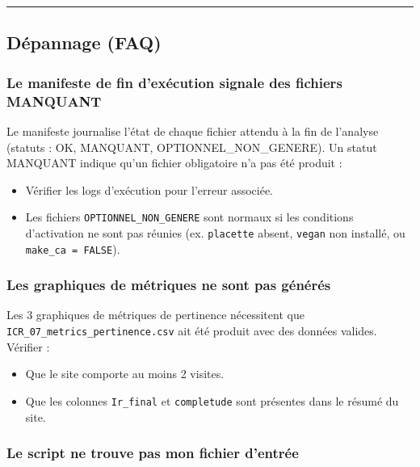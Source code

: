 \begin{center}\rule{0.5\linewidth}{0.5pt}\end{center}

\subsection{Dépannage (FAQ)}\label{duxe9pannage-faq}

\subsubsection{Le manifeste de fin d'exécution signale des fichiers
MANQUANT}\label{le-manifeste-de-fin-dexuxe9cution-signale-des-fichiers-manquant}

Le manifeste journalise l'état de chaque fichier attendu à la fin de
l'analyse (statuts : OK, MANQUANT, OPTIONNEL\_NON\_GENERE). Un statut
MANQUANT indique qu'un fichier obligatoire n'a pas été produit :

\begin{itemize}
\tightlist
\item
  Vérifier les logs d'exécution pour l'erreur associée.
\item
  Les fichiers \texttt{OPTIONNEL\_NON\_GENERE} sont normaux si les
  conditions d'activation ne sont pas réunies (ex. \texttt{placette}
  absent, \texttt{vegan} non installé, ou \texttt{make\_ca\ =\ FALSE}).
\end{itemize}

\subsubsection{Les graphiques de métriques ne sont pas
générés}\label{les-graphiques-de-muxe9triques-ne-sont-pas-guxe9nuxe9ruxe9s}

Les 3 graphiques de métriques de pertinence nécessitent que
\texttt{ICR\_07\_metrics\_pertinence.csv} ait été produit avec des
données valides. Vérifier :

\begin{itemize}
\tightlist
\item
  Que le site comporte au moins 2 visites.
\item
  Que les colonnes \texttt{Ir\_final} et \texttt{completude} sont
  présentes dans le résumé du site.
\end{itemize}

\subsubsection{Le script ne trouve pas mon fichier
d'entrée}\label{le-script-ne-trouve-pas-mon-fichier-dentruxe9e}

